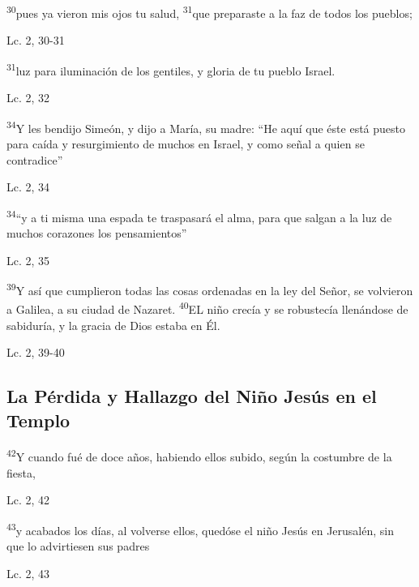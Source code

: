 \documentclass[a4paper,11pt]{article}
\begin{document}
      \textsuperscript{30}pues ya vieron mis ojos tu salud, \textsuperscript{31}que preparaste a la faz de todos los pueblos;
      \begin{flushright}
        Lc. 2, 30-31         
      \end{flushright}
      
      \textsuperscript{31}luz para iluminación de los gentiles, y gloria de tu pueblo Israel.
      \begin{flushright}
        Lc. 2, 32        
      \end{flushright}
      
      \textsuperscript{34}Y les bendijo Simeón, y dijo a María, su madre: ``He aquí que éste está puesto para caída y resurgimiento de muchos en Israel, y como
        señal a quien se contradice''
      \begin{flushright}
        Lc. 2, 34       
      \end{flushright}
      
      \textsuperscript{34}``y a ti misma una espada te traspasará el alma, para que salgan a la luz de muchos corazones los pensamientos''
      \begin{flushright}
        Lc. 2, 35         
      \end{flushright}      
      
      \textsuperscript{39}Y así que cumplieron todas las cosas ordenadas en la ley del Señor, se volvieron a Galilea, a su ciudad de Nazaret. \textsuperscript{40}EL niño crecía
      y se robustecía llenándose de sabiduría, y la gracia de Dios estaba en Él.
      \begin{flushright}
        Lc. 2, 39-40         
      \end{flushright}
            
    \subsection*{\hfil La Pérdida y Hallazgo del Niño Jesús en el Templo \hfil}
      
      \textsuperscript{42}Y cuando fué de doce años, habiendo ellos subido, según la costumbre de la fiesta,
      \begin{flushright}
        Lc. 2, 42     
      \end{flushright}
      
      \textsuperscript{43}y acabados los días, al volverse ellos, quedóse el niño Jesús en Jerusalén, sin que lo advirtiesen sus padres
      \begin{flushright}
        Lc. 2, 43        
      \end{flushright}
      
\end{document}
